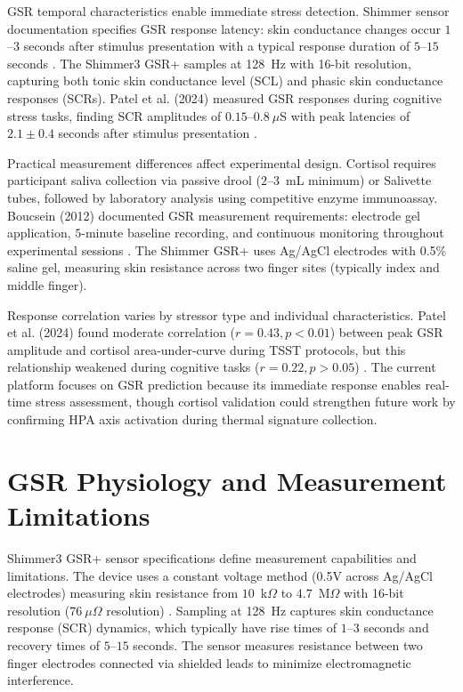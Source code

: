 \documentclass{report}
\begin{document}
GSR temporal characteristics enable immediate stress detection. Shimmer sensor documentation specifies GSR response latency: skin conductance changes occur $1$--$3$ seconds after stimulus presentation with a typical response duration of $5$--$15$ seconds \cite{shimmerdoc8}. The Shimmer3 GSR+ samples at 128~Hz with 16-bit resolution, capturing both tonic skin conductance level (SCL) and phasic skin conductance responses (SCRs). Patel et al. (2024) measured GSR responses during cognitive stress tasks, finding SCR amplitudes of $0.15$--$0.8~\mu$S with peak latencies of $2.1 \pm 0.4$ seconds after stimulus presentation \cite{patel2024}.

Practical measurement differences affect experimental design. Cortisol requires participant saliva collection via passive drool ($2$--$3$~mL minimum) or Salivette tubes, followed by laboratory analysis using competitive enzyme immunoassay. Boucsein (2012) documented GSR measurement requirements: electrode gel application, $5$-minute baseline recording, and continuous monitoring throughout experimental sessions \cite{boucsein2012}. The Shimmer GSR+ uses Ag/AgCl electrodes with 0.5\% saline gel, measuring skin resistance across two finger sites (typically index and middle finger).

Response correlation varies by stressor type and individual characteristics. Patel et al. (2024) found moderate correlation ($r = 0.43, p < 0.01$) between peak GSR amplitude and cortisol area-under-curve during TSST protocols, but this relationship weakened during cognitive tasks ($r = 0.22, p > 0.05$) \cite{patel2024}. The current platform focuses on GSR prediction because its immediate response enables real-time stress assessment, though cortisol validation could strengthen future work by confirming HPA axis activation during thermal signature collection.


\section{GSR Physiology and Measurement Limitations}
\label{sec:gsr_physiology}

Shimmer3 GSR+ sensor specifications define measurement capabilities and limitations. The device uses a constant voltage method (0.5V across Ag/AgCl electrodes) measuring skin resistance from $10$~k$\Omega$ to $4.7$~M$\Omega$ with 16-bit resolution ($76~\mu\Omega$ resolution) \cite{shimmerdoc8}. Sampling at 128~Hz captures skin conductance response (SCR) dynamics, which typically have rise times of $1$--$3$ seconds and recovery times of $5$--$15$ seconds. The sensor measures resistance between two finger electrodes connected via shielded leads to minimize electromagnetic interference.
\end{document}

